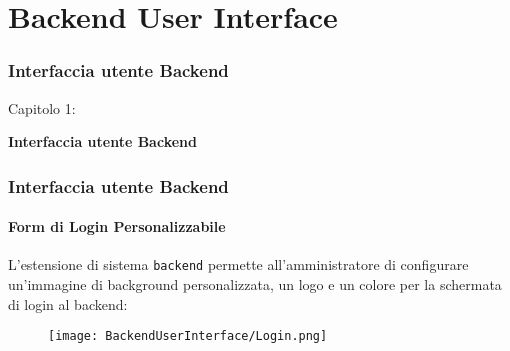 %

\section{Backend User Interface}
\begin{frame}[fragile]
	\frametitle{Interfaccia utente Backend}

	\begin{center}\huge{Capitolo 1:}\end{center}
	\begin{center}\huge{\color{typo3darkgrey}\textbf{Interfaccia utente Backend}}\end{center}

\end{frame}

\begin{frame}[fragile]
	\frametitle{Interfaccia utente Backend}
	\framesubtitle{Form di Login Personalizzabile}

	L'estensione di sistema \texttt{backend} permette all'amministratore di configurare un'immagine
	di background personalizzata, un logo e un colore per la schermata di login al backend:

	\begin{figure}
		\texttt{[image: BackendUserInterface/Login.png]}
	\end{figure}

\end{frame}


